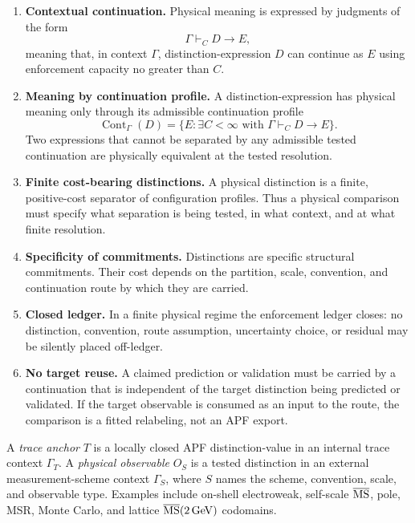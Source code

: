 \begin{enumerate}
\item \textbf{Contextual continuation.}  Physical meaning is expressed by judgments of the form
\[
        \Gamma\vdash_C D\to E,
\]
meaning that, in context $\Gamma$, distinction-expression $D$ can continue as $E$ using enforcement capacity no greater than $C$.

\item \textbf{Meaning by continuation profile.}  A distinction-expression has physical meaning only through its admissible continuation profile
\[
        \operatorname{Cont}_{\Gamma}(D)
        =\{E:\exists C<\infty\text{ with }\Gamma\vdash_C D\to E\}.
\]
Two expressions that cannot be separated by any admissible tested continuation are physically equivalent at the tested resolution.

\item \textbf{Finite cost-bearing distinctions.}  A physical distinction is a finite, positive-cost separator of configuration profiles.  Thus a physical comparison must specify what separation is being tested, in what context, and at what finite resolution.

\item \textbf{Specificity of commitments.}  Distinctions are specific structural commitments.  Their cost depends on the partition, scale, convention, and continuation route by which they are carried.

\item \textbf{Closed ledger.}  In a finite physical regime the enforcement ledger closes: no distinction, convention, route assumption, uncertainty choice, or residual may be silently placed off-ledger.

\item \textbf{No target reuse.}  A claimed prediction or validation must be carried by a continuation that is independent of the target distinction being predicted or validated.  If the target observable is consumed as an input to the route, the comparison is a fitted relabeling, not an APF export.
\end{enumerate}

\begin{definition}
A \emph{trace anchor} $T$ is a locally closed APF distinction-value in an internal trace context $\Gamma_T$.  A \emph{physical observable} $O_S$ is a tested distinction in an external measurement-scheme context $\Gamma_S$, where $S$ names the scheme, convention, scale, and observable type.  Examples include on-shell electroweak, self-scale $\overline{\rm MS}$, pole, MSR, Monte Carlo, and lattice $\overline{\rm MS}(2\,\mathrm{GeV})$ codomains.
\end{definition}

